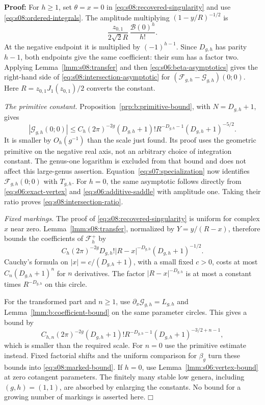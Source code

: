 \documentclass[a4paper,10pt]{article}
\numberwithin{equation}{section}
\theoremstyle{paperplain}
\theoremstyle{paperremark}
\theoremstyle{paperplain}
\newenvironment{prf}{\noindent \textbf{Proof: }}{\hfill $\mdlgwhtsquare$\par\addvspace{0.5\baselineskip}}
\begin{document}
\begin{prf}
For $h\geq1$, set $\theta=x=0$ in
\eqref{eq:s08:recovered-singularity} and use
\eqref{eq:s08:ordered-integrals}. The amplitude multiplying
$(1-y/R)^{-1/2}$ is
\[
 \frac{z_{0,1}}{2\sqrt2 R}\,
                         \frac{\mathcal B(0)^h}{h!}.
\]
At the negative endpoint it is multiplied by $(-1)^{h-1}$.
Since $D_{g,h}$ has parity $h-1$, both endpoints give the same
coefficient: their sum has a factor two. Applying
Lemma~\ref{lmm:s08:transfer} and then
\eqref{eq:s06:beta-asymptotics} gives the right-hand side of
\eqref{eq:s08:intersection-asymptotic} for
$(\mathcal F_{g,h}-\mathcal G_{g,h})(0;0)$.
Here $R=z_{0,1}J_1(z_{0,1})/2$ converts the constant.

\smallskip\noindent
\emph{The primitive constant.}
Proposition~\ref{prp:b:primitive-bound}, with $N=D_{g,h}+1$, gives
\[
 |\mathcal G_{g,h}(0;0)|
 \leq C_h(2\pi)^{-2g}(D_{g,h}+1)!
                  R^{-D_{g,h}-1}(D_{g,h}+1)^{-5/2}.
\]
It is smaller by $O_h(g^{-1})$ than the scale just found.
Its proof uses the geometric primitive on the negative real axis,
not an arbitrary choice of integration constant. The genus-one
logarithm is excluded from that bound and does not affect this
large-genus assertion. Equation~\eqref{eq:s07:specialization}
now identifies $\mathcal F_{g,h}(0;0)$ with $T_{g,h}$.
For $h=0$, the same asymptotic follows directly from
\eqref{eq:s06:exact-vertex} and \eqref{eq:s06:additive-saddle}
with amplitude one. Taking their ratio proves
\eqref{eq:s08:intersection-ratio}.

\smallskip\noindent
\emph{Fixed markings.}
The proof of \eqref{eq:s08:recovered-singularity} is uniform for
complex $x$ near zero. Lemma~\ref{lmm:s08:transfer}, normalized by
$Y=y/(R-x)$, therefore bounds the coefficients of
$\mathcal F_h^+$ by
\[
 C_h(2\pi)^{-2g}D_{g,h}!|R-x|^{-D_{g,h}}
                                      (D_{g,h}+1)^{-1/2}.
\]
Cauchy's formula on $|x|=c/(D_{g,h}+1)$, with a small fixed
$c>0$, costs at most $C_n(D_{g,h}+1)^n$ for $n$ derivatives.
The factor $|R-x|^{-D_{g,h}}$ is at most a constant times
$R^{-D_{g,h}}$ on this circle.

For the transformed part and
$n\geq1$, use $\partial_x\mathcal G_{g,h}=L_{g,h}$ and
Lemma~\ref{lmm:b:coefficient-bound} on the same parameter circles.
This gives a bound by
\[
 C_{h,n}(2\pi)^{-2g}(D_{g,h}+1)!R^{-D_{g,h}-1}
                  (D_{g,h}+1)^{-3/2+n-1},
\]
which is smaller than the required scale. For $n=0$ use the
primitive estimate instead. Fixed factorial shifts and the uniform
comparison for $\beta_g$ turn these bounds into
\eqref{eq:s08:marked-bound}. If $h=0$, use
Lemma~\ref{lmm:s06:vertex-bound} at zero cotangent parameters.
The finitely many stable low genera, including $(g,h)=(1,1)$,
are absorbed by enlarging the constants. No bound for a growing
number of markings is asserted here.
\end{prf}
\end{document}
